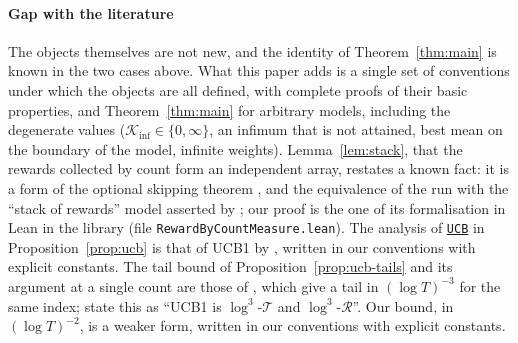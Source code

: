 \documentclass[11pt]{article}
\newcommand{\ucb}{\hyperref[alg:ucb]{\texttt{UCB}}}
\begin{document}
\paragraph{Gap with the literature} The objects themselves are not new, and the identity of
Theorem~\ref{thm:main} is known in the two cases above. What this paper adds is a single set of
conventions under which the objects are all defined, with complete proofs of their basic
properties, and Theorem~\ref{thm:main} for arbitrary models, including the degenerate values
($\mathcal K_{\inf}\in\{0,\infty\}$, an infimum that is not attained, best mean on the boundary of
the model, infinite weights). Lemma~\ref{lem:stack}, that the rewards collected by count form an
independent array, restates a known fact: it is a form of the optional skipping theorem
\citep[see also][]{D36}, and the equivalence of the run with the ``stack of rewards'' model asserted by
\citet[Section~4.6]{LS}; our proof is the one of its formalisation in Lean in the library
\citet{LML} (file \texttt{RewardByCountMeasure.lean}). The analysis of \ucb{} in
Proposition~\ref{prop:ucb} is that of UCB1 by \citet[Theorem~1]{ACF02}, written in our conventions
with explicit constants. The tail bound of Proposition~\ref{prop:ucb-tails} and its argument at a
single count are those of \citet[Theorem~8 and its proof]{AMS09}, which give a tail in
$(\log T)^{-3}$ for the same index; \citet[Section~2]{SA11} state this as ``UCB1 is $\log^3$-$\mathcal T$
and $\log^3$-$\mathcal R$''. Our bound, in $(\log T)^{-2}$, is a weaker form, written in our conventions
with explicit constants.
\end{document}
